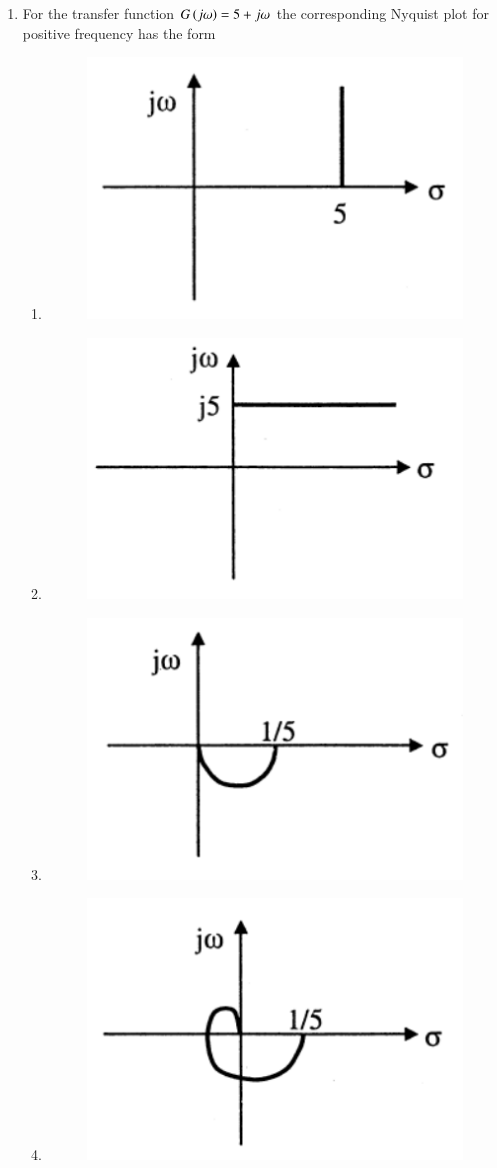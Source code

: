 \documentclass[a4paper, 11pt]{article}
\begin{document}
\begin{enumerate}
    \item For the transfer function $G\left(j\omega\right)=5+j\omega$ the corresponding Nyquist plot for positive frequency has the form
    \begin{enumerate}
        \item \begin{figure}[H] \centering \includegraphics[width=0.3\columnwidth]{figs/q4A.png} \caption*{} \label{fig:a4A} \end{figure}
        \item \begin{figure}[H] \centering \includegraphics[width=0.3\columnwidth]{figs/q4B.png} \caption*{} \label{fig:a4B} \end{figure}
        \item \begin{figure}[H] \centering \includegraphics[width=0.3\columnwidth]{figs/q4C.png} \caption*{} \label{fig:a4C} \end{figure}
        \item \begin{figure}[H] \centering \includegraphics[width=0.3\columnwidth]{figs/q4D.png} \caption*{} \label{fig:a4D} \end{figure}
    \end{enumerate}


\end{enumerate}
\end{document}
